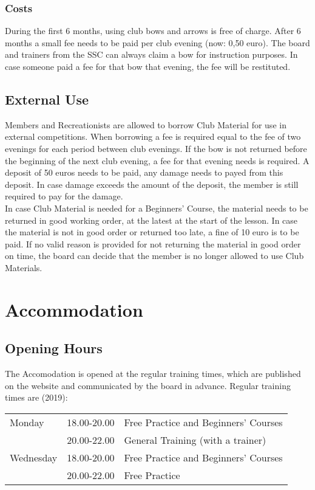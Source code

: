 \documentclass[a4paper]{article}
\begin{document}
\subsubsection{Costs}
During the first 6 months, using club bows and arrows is free of charge. After 6 months a small fee needs to be paid per club evening (now: 0,50 euro). The board and trainers from the SSC can always claim a bow for instruction purposes. In case someone paid a fee for that bow that evening, the fee will be restituted.

\subsection{External Use}
Members and Recreationists are allowed to borrow Club Material for use in external competitions. When borrowing a fee is required equal to the fee of two evenings for each period between club evenings. If the bow is not returned before the beginning of the next club evening, a fee for that evening needs is required. A deposit of 50 euros needs to be paid, any damage needs to payed from this deposit. In case damage exceeds the amount of the deposit, the member is still required to pay for the damage. \\

In case Club Material is needed for a Beginners' Course, the material needs to be returned in good working order, at the latest at the start of the lesson. In case the material is not in good order or returned too late, a fine of 10 euro is to be paid. If no valid reason is provided for not returning the material in good order on time, the board can decide that the member is no longer allowed to use Club Materials.

\section{Accommodation}
\subsection{Opening Hours}
\label{section:opening}
The Accomodation is opened at the regular training times, which are published on the website and communicated by the board in advance. Regular training times are {\g (2019)}: \\

\begin{tabular}{lll}
Monday    & 18.00-20.00 & Free Practice  and Beginners’ Courses \\
          & 20.00-22.00 & General Training (with a trainer)     \\
Wednesday & 18.00-20.00 & Free Practice and Beginners' Courses  \\
          & 20.00-22.00 & Free Practice                        
\end{tabular}
\end{document}

